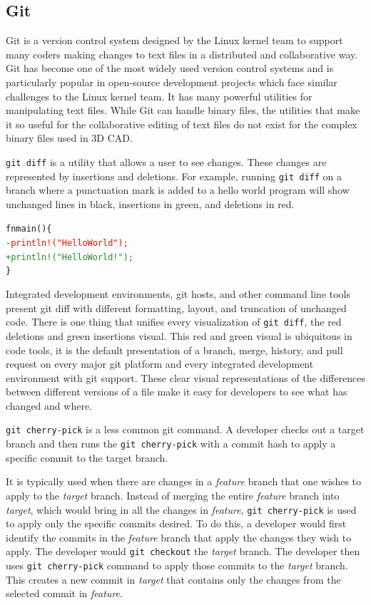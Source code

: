 \documentclass[sigconf,authorversion,nonacm]{acmart}
\begin{document}
\subsection{Git}

Git is a version control system designed by the Linux kernel team to support many coders making changes to text files in a distributed and collaborative way.
Git has become one of the most widely used version control systems and is particularly popular in open-source development projects which face similar challenges to the Linux kernel team.
It has many powerful utilities for manipulating text files.
While Git can handle binary files, the utilities that make it so useful for the collaborative editing of text files do not exist for the complex binary files used in 3D CAD.

\texttt{git diff} is a utility that allows a user to see changes.
These changes are represented by insertions and deletions.
For example, running \texttt{git diff} on a branch where a punctuation mark is added to a hello world program will show unchanged lines in black, insertions in green, and deletions in red.

\begin{alltt}
	fn main ()\{
	\textcolor{red}{   - println!("Hello World");}
	\textcolor{ForestGreen}{   + println!("Hello World!");}
	\}
\end{alltt}

Integrated development environments, git hosts, and other command line tools present git diff with different formatting, layout, and truncation of unchanged code.
There is one thing that unifies every visualization of \texttt{git diff}, the red deletions and green insertions visual.
This red and green visual is ubiquitous in code tools, it is the default presentation of a branch, merge, history, and pull request on every major git platform and every integrated development environment with git support.
These clear visual representations of the differences between different versions of a file make it easy for developers to see what has changed and where.

\texttt{git cherry-pick} is a less common git command.
A developer checks out a target branch and then runs the \texttt{git cherry-pick} with a commit hash to apply a specific commit to the target branch.

It is typically used when there are changes in a \emph{feature} branch that one wishes to apply to the \emph{target} branch.
Instead of merging the entire \emph{feature} branch into \emph{target}, which would bring in all the changes in \emph{feature}, \texttt{git cherry-pick} is used to apply only the specific commits desired.
To do this, a developer would first identify the commits in the \emph{feature} branch that apply the changes they wish to apply.
The developer would \texttt{git checkout} the \emph{target} branch.
The developer then uses \texttt{git cherry-pick} command to apply those commits to the \emph{target} branch.
This creates a new commit in \emph{target} that contains only the changes from the selected commit in \emph{feature}.
\end{document}
